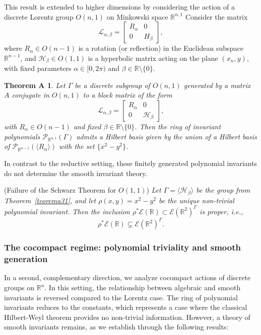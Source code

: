 \documentclass[]{article}
\newtheorem*{theoremA}{Theorem A}
\begin{document}
This result is extended to higher dimensions by considering the action of a discrete Lorentz group $O(n,1)$ on Minkowski space $\mathbb{R}^{n,1}$
 Consider the matrix
$$
\mathcal{L}_{\alpha,\beta} = \begin{bmatrix} R_{\alpha} & 0 \\ 0 & H_{\beta} \end{bmatrix},
$$
where $R_{\alpha} \in O(n-1)$ is a rotation (or reflection) in the Euclidean subspace $\mathbb{R}^{n-1}$, and $ \mathcal{H}_\beta \in O(1,1)$ is a hyperbolic matrix acting on the plane $(x_n, y)$, with fixed parameters $\alpha \in [0,2\pi)$ and $\beta \in \mathbb{R} \setminus \{0\}$.

\begin{theoremA}\label{theoremaB}
		Let $\Gamma$ be a discrete subgroup of $O(n,1)$ generated by a matrix $A$ conjugate in $O(n,1)$ to a block matrix of the form
	$$
	\mathcal{L}_{\alpha,\beta} = 
	\begin{bmatrix}
		R_\alpha & 0 \\
		0 & \mathcal{H}_\beta
	\end{bmatrix},
	$$
	with $R_\alpha \in O(n-1)$ and fixed $\beta \in \mathbb{R}\setminus\{0\}$. Then the ring of invariant polynomials
	$
	\mathcal{P}_{\mathbb{R}^{n,1}}(\Gamma)
	$
	admits a Hilbert basis given by the union of a Hilbert basis of $\mathcal{P}_{\mathbb{R}^{n-1}}(\langle R_\alpha \rangle)$ with the set $\{x^2 - y^2\}$.
\end{theoremA}

In contrast to the reductive setting, these finitely generated polynomial invariants do not determine the smooth invariant theory.

(Failure of the Schwarz Theorem for $O(1,1)$)
	\label{prop:lorentz_schwarz_fails}
	 {\it Let $\Gamma = \langle \mathcal{H}_\beta \rangle$ be the group from Theorem~\ref{teorema31}, and let $\rho(x,y) = x^2 - y^2$ be the unique non-trivial polynomial invariant. Then the inclusion $\rho^*\mathcal{E}(\mathbb{R}) \subset \mathcal{E}(\mathbb{R}^2)^\Gamma$ is proper, i.e.,
	\[
	\rho^*\mathcal{E}(\mathbb{R}) \subsetneq \mathcal{E}(\mathbb{R}^2)^\Gamma.
	\]
}

\subsubsection{The cocompact regime: polynomial triviality and smooth generation}


In a second, complementary direction, we analyze cocompact actions of discrete groups on $\mathbb{R}^n$. In this setting, the relationship between algebraic and smooth invariants is reversed compared to the Lorentz case. The ring of polynomial invariants reduces to the constants, which represents a case where the classical Hilbert-Weyl theorem provides no non-trivial information. However, a theory of smooth invariants remains, as we establish through the following results:
\end{document}

